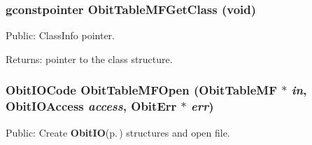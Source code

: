 \subsubsection{\setlength{\rightskip}{0pt plus 5cm}gconstpointer Obit\-Table\-MFGet\-Class (void)}\label{ObitTableMF_8h_a13}


Public: Class\-Info pointer. 

\begin{Desc}
\item[Returns:]pointer to the class structure. \end{Desc}
\subsubsection{\setlength{\rightskip}{0pt plus 5cm}Obit\-IOCode Obit\-Table\-MFOpen ({\bf Obit\-Table\-MF} $\ast$ {\em in}, Obit\-IOAccess {\em access}, {\bf Obit\-Err} $\ast$ {\em err})}\label{ObitTableMF_8h_a17}


Public: Create {\bf Obit\-IO}{\rm (p.\,\pageref{structObitIO})} structures and open file. 

